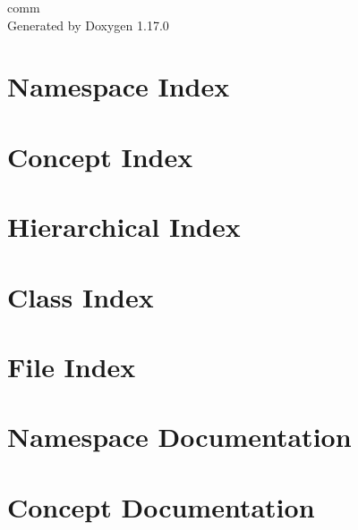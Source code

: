 \documentclass[twoside]{book}
\newcommand{\+}{\discretionary{\mbox{\scriptsize$\hookleftarrow$}}{}{}}
\newcommand{\clearemptydoublepage}{%
    \newpage{\pagestyle{empty}\cleardoublepage}%
  }
\begin{document}
  \raggedbottom
    \hypersetup{pageanchor=false,
                bookmarksnumbered=true,
                pdfencoding=unicode
               }
  \begin{titlepage}
  \vspace*{7cm}
  \begin{center}%
  {\Large comm}\\
  \vspace*{1cm}
  {\large Generated by Doxygen 1.17.0}\\
  \end{center}
  \end{titlepage}
  \clearemptydoublepage
  \tableofcontents
  \clearemptydoublepage
  \hypersetup{pageanchor=true}


\chapter{Namespace Index}

\chapter{Concept Index}

\chapter{Hierarchical Index}

\chapter{Class Index}

\chapter{File Index}

\chapter{Namespace Documentation}

\chapter{Concept Documentation}








\end{document}
